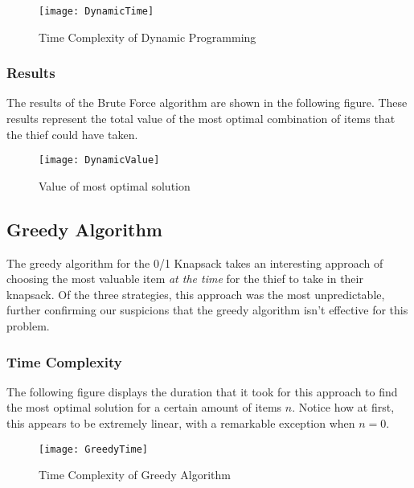 \documentclass[12pt]{article}
\begin{document}
       	\begin{figure}[H]
		\begin{center}    
    		\texttt{[image: DynamicTime]}
            \caption{Time Complexity of Dynamic Programming}
    	\end{center}
    \end{figure}
    
    \subsubsection*{Results}
    
    The results of the Brute Force algorithm are shown in the following figure. These results represent the total value of the most optimal combination of items that the thief could have taken.
    
       	\begin{figure}[H]
		\begin{center}    
    		\texttt{[image: DynamicValue]}
           \caption{Value of most optimal solution}
    	\end{center}
    \end{figure}
    
    \subsection*{Greedy Algorithm}
    
    The greedy algorithm for the 0/1 Knapsack takes an interesting approach of choosing the most valuable item \textit{at the time} for the thief to take in their knapsack. Of the three strategies, this approach was the most unpredictable, further confirming our suspicions that the greedy algorithm isn't effective for this problem. 
    
    \subsubsection*{Time Complexity}
    
   The following figure displays the duration that it took for this approach to find the most optimal solution for a certain amount of items $n$. Notice how at first, this appears to be extremely linear, with a remarkable exception when $n = 0$.  
    
    \begin{figure}[H]
		\begin{center}    
    		\texttt{[image: GreedyTime]}
            \caption{Time Complexity of Greedy Algorithm}
    	\end{center}
    \end{figure}
    
\end{document}
